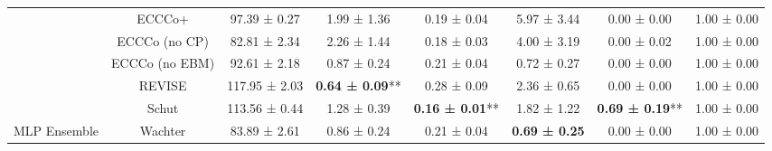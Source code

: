 \begin{table}
{\begin{tabular}[t]{cccccccc}
 & ECCCo+ & 97.39 ± 0.27\hphantom{*}\hphantom{*} & 1.99 ± 1.36\hphantom{*}\hphantom{*} & 0.19 ± 0.04\hphantom{*}\hphantom{*} & 5.97 ± 3.44\hphantom{*}\hphantom{*} & 0.00 ± 0.00\hphantom{*}\hphantom{*} & 1.00 ± 0.00\hphantom{*}\hphantom{*}\\

 & ECCCo (no CP) & 82.81 ± 2.34\hphantom{*}\hphantom{*} & 2.26 ± 1.44\hphantom{*}\hphantom{*} & 0.18 ± 0.03\hphantom{*}\hphantom{*} & 4.00 ± 3.19\hphantom{*}\hphantom{*} & 0.00 ± 0.02\hphantom{*}\hphantom{*} & 1.00 ± 0.00\hphantom{*}\hphantom{*}\\

 & ECCCo (no EBM) & 92.61 ± 2.18\hphantom{*}\hphantom{*} & 0.87 ± 0.24\hphantom{*}\hphantom{*} & 0.21 ± 0.04\hphantom{*}\hphantom{*} & 0.72 ± 0.27\hphantom{*}\hphantom{*} & 0.00 ± 0.00\hphantom{*}\hphantom{*} & 1.00 ± 0.00\hphantom{*}\hphantom{*}\\

 & REVISE & 117.95 ± 2.03\hphantom{*}\hphantom{*} & \textbf{0.64 ± 0.09}** & 0.28 ± 0.09\hphantom{*}\hphantom{*} & 2.36 ± 0.65\hphantom{*}\hphantom{*} & 0.00 ± 0.00\hphantom{*}\hphantom{*} & 1.00 ± 0.00\hphantom{*}\hphantom{*}\\

 & Schut & 113.56 ± 0.44\hphantom{*}\hphantom{*} & 1.28 ± 0.39\hphantom{*}\hphantom{*} & \textbf{0.16 ± 0.01}** & 1.82 ± 1.22\hphantom{*}\hphantom{*} & \textbf{0.69 ± 0.19}** & 1.00 ± 0.00\hphantom{*}\hphantom{*}\\

\multirow[t]{-10}{*}{\centering\arraybackslash MLP Ensemble} & Wachter & 83.89 ± 2.61\hphantom{*}\hphantom{*} & 0.86 ± 0.24\hphantom{*}\hphantom{*} & 0.21 ± 0.04\hphantom{*}\hphantom{*} & \textbf{0.69 ± 0.25}\hphantom{*}\hphantom{*} & 0.00 ± 0.00\hphantom{*}\hphantom{*} & 1.00 ± 0.00\hphantom{*}\hphantom{*}\\
\bottomrule
\end{tabular}}
\end{table}
